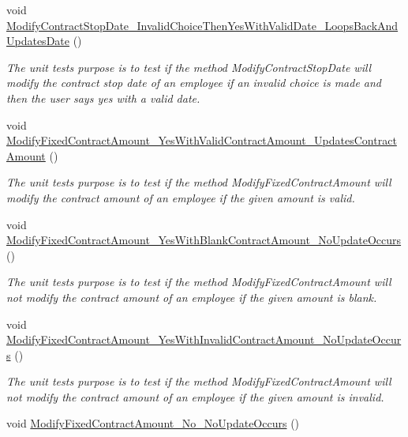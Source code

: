\begin{DoxyCompactItemize}
void \hyperlink{class_the_company_1_1_tests_1_1_modify_employee_tests_a81a496c9bccbcd37c46244cf9f214b59}{Modify\+Contract\+Stop\+Date\+\_\+\+Invalid\+Choice\+Then\+Yes\+With\+Valid\+Date\+\_\+\+Loops\+Back\+And\+Updates\+Date} ()
\begin{DoxyCompactList}\small\item\em The unit test\textquotesingle{}s purpose is to test if the method Modify\+Contract\+Stop\+Date will modify the contract stop date of an employee if an invalid choice is made and then the user says yes with a valid date. \end{DoxyCompactList}\item 
void \hyperlink{class_the_company_1_1_tests_1_1_modify_employee_tests_aae7a6408546578023f5ca3bb6ef60129}{Modify\+Fixed\+Contract\+Amount\+\_\+\+Yes\+With\+Valid\+Contract\+Amount\+\_\+\+Updates\+Contract\+Amount} ()
\begin{DoxyCompactList}\small\item\em The unit test\textquotesingle{}s purpose is to test if the method Modify\+Fixed\+Contract\+Amount will modify the contract amount of an employee if the given amount is valid. \end{DoxyCompactList}\item 
void \hyperlink{class_the_company_1_1_tests_1_1_modify_employee_tests_a49db2ddacfc758808bb6b2bac4990345}{Modify\+Fixed\+Contract\+Amount\+\_\+\+Yes\+With\+Blank\+Contract\+Amount\+\_\+\+No\+Update\+Occurs} ()
\begin{DoxyCompactList}\small\item\em The unit test\textquotesingle{}s purpose is to test if the method Modify\+Fixed\+Contract\+Amount will not modify the contract amount of an employee if the given amount is blank. \end{DoxyCompactList}\item 
void \hyperlink{class_the_company_1_1_tests_1_1_modify_employee_tests_af2e26964141b003c1e258b67bba89bfe}{Modify\+Fixed\+Contract\+Amount\+\_\+\+Yes\+With\+Invalid\+Contract\+Amount\+\_\+\+No\+Update\+Occurs} ()
\begin{DoxyCompactList}\small\item\em The unit test\textquotesingle{}s purpose is to test if the method Modify\+Fixed\+Contract\+Amount will not modify the contract amount of an employee if the given amount is invalid. \end{DoxyCompactList}\item 
void \hyperlink{class_the_company_1_1_tests_1_1_modify_employee_tests_a0c08322381bab9d25210ba4eeb8eb9fc}{Modify\+Fixed\+Contract\+Amount\+\_\+\+No\+\_\+\+No\+Update\+Occurs} ()

\end{DoxyCompactItemize}
